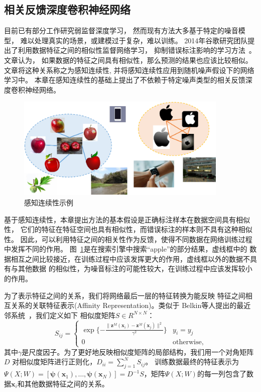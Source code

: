 \documentclass[doctor]{ustcthesis}
\def \x {\mathbf{x}}
\def \z {\mathbf{z}}
\def \vpsi {\boldsymbol{\psi}}
\begin{document}
\subsection{相关反馈深度卷积神经网络}
目前已有部分工作研究弱监督深度学习， 然而现有方法大多基于特定的噪音模型，
难以处理真实的场景，或建模过于复杂，难以训练。
2014年谷歌研究团队提出了利用数据特征之间的相似性监督网络学习，
抑制错误标注影响的学习方法~\cite{reed2014training}。文章认为，
如果数据的特征之间具有相似性，那么预测的结果也应该比较相似。
文章将这种关系称之为感知连续性, 并将感知连续性应用到随机噪声假设下的网络学习中。
本章在感知连续性的基础上提出了不依赖于特定噪声类型的相关反馈深度卷积神经网络。

\begin{figure}[t]
    \centering
    \includegraphics[clip=true, width=0.9\textwidth]{perceptual-consistence.pdf}
    \caption{感知连续性示例}
    \label{fig:perceptual-consistence}
\end{figure}

基于感知连续性，本章提出方法的基本假设是正确标注样本在数据空间具有相似性，
它们的特征在特征空间也具有相似性，而错误标注的样本则不具有这种相似性。
因此，可以利用特征之间的相关性作为反馈，使得不同数据在网络训练过程中发挥不同的作用。
图~\ref{fig:perceptual-consistence}是在搜索引擎中搜索``apple''的部分结果，虚线框中的
数据相互之间比较接近，在训练过程中应该发挥更大的作用，虚线框以外的数据不具有与其他数据
的相似性，为噪音标注的可能性较大，在训练过程中应该发挥较小的作用。

为了表示特征之间的关系，我们将网络最后一层的特征转换为能反映
特征之间相互关系的关联特征表示(Affinity Representation)。类似于
Belkin等人提出的最近邻系统~\cite{belkin2001laplacian}，我们定义如下
相似度矩阵$S\in R^{N \times N}$：
\begin{equation}\label{eqn:rf-cnn-sim}
    S_{ij} =
    \begin{cases}
        \exp\{-\frac{\|\z^M(\x_i) - \z^M(\x_j)\|^2}{\gamma^2}\} & y_i = y_j\\
        0 & \text{otherwise},
    \end{cases}
\end{equation}
其中$\gamma$是尺度因子。为了更好地反映相似度矩阵的局部结构，我们用一个对角矩阵$D$
对相似度矩阵进行正则化，$D_{ii} = \sum_{j=1}^N S_{ij}$。
训练数据最终的特征表示为$\Psi(X;W) = [\vpsi(\x_1), \ldots, \vpsi(\x_N)] =
D^{-1}S$，矩阵$\Psi(X;W)$的每一列包含了数据$\x_i$和其他数据特征之间的关系。
\end{document}
